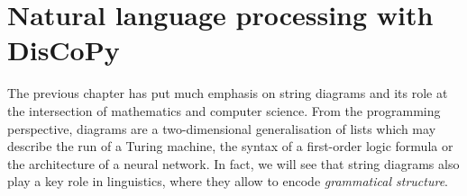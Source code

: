 
\section{Natural language processing with DisCoPy}\label{section:NLP}

The previous chapter has put much emphasis on string diagrams and its role at the intersection of mathematics and computer science.
From the programming perspective, diagrams are a two-dimensional generalisation of lists which may describe the run of a Turing machine, the syntax of a first-order logic formula or the architecture of a neural network.
In fact, we will see that string diagrams also play a key role in linguistics, where they allow to encode \emph{grammatical structure}.

%
%
%
%

